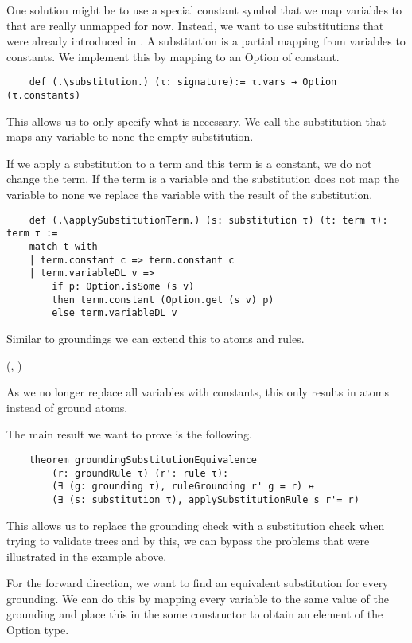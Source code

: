     One solution might be to use a special constant symbol that we map variables to that are really unmapped for now.
    Instead, we want to use substitutions that were already introduced in \cite{datalogCoq}. A substitution is a partial mapping from variables to constants. We implement this by mapping to an Option of constant.

    \begin{lstlisting}
    def (.\substitution.) (τ: signature):= τ.vars → Option (τ.constants)
    \end{lstlisting}

    This allows us to only specify what is necessary. We call the substitution that maps any variable to none the empty substitution.
    
    If we apply a substitution to a term and this term is a constant, we do not change the term. If the term is a variable and the substitution does not map the variable to none we replace the variable with the result of the substitution.

    \begin{lstlisting}
    def (.\applySubstitutionTerm.) (s: substitution τ) (t: term τ): term τ :=
    match t with
    | term.constant c => term.constant c
    | term.variableDL v => 
        if p: Option.isSome (s v) 
        then term.constant (Option.get (s v) p) 
        else term.variableDL v
    \end{lstlisting}

    Similar to groundings we can extend this to atoms and rules. 
    
    (\applySubstitutionAtom, \applySubstitutionRule)
    
    As we no longer replace all variables with constants, this only results in atoms instead of ground atoms.

    The main result we want to prove is the following.

    \begin{lstlisting}
    theorem groundingSubstitutionEquivalence 
        (r: groundRule τ) (r': rule τ):
        (∃ (g: grounding τ), ruleGrounding r' g = r) ↔ 
        (∃ (s: substitution τ), applySubstitutionRule s r'= r)
    \end{lstlisting}

    This allows us to replace the grounding check with a substitution check when trying to validate trees and by this, we can bypass the problems that were illustrated in the example above. 

    For the forward direction, we want to find an equivalent substitution for every grounding. We can do this by mapping every variable to the same value of the grounding and place this in the some constructor to obtain an element of the Option type.


